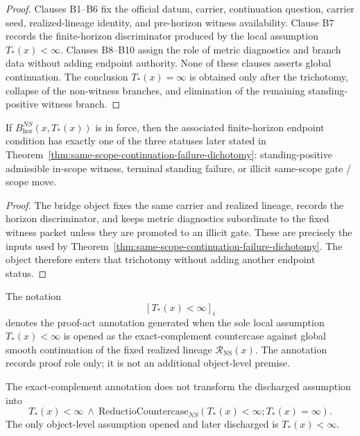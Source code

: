 \begin{proof}
Clauses B1--B6 fix the official datum, carrier, continuation question, carrier seed, realized-lineage identity, and pre-horizon witness availability. Clause B7 records the finite-horizon discriminator produced by the local assumption $T_*(x)<\infty$. Clauses B8--B10 assign the role of metric diagnostics and branch data without adding endpoint authority. None of these clauses asserts global continuation. The conclusion $T_*(x)=\infty$ is obtained only after the trichotomy, collapse of the non-witness branches, and elimination of the remaining standing-positive witness branch.
\end{proof}

\begin{manualtheorem}
\label{thm:ns-horizon-bridge-trichotomy}
If $B^{NS}_{\mathrm{hor}}(x,T_*(x))$ is in force, then the associated finite-horizon endpoint condition has exactly one of the three statuses later stated in Theorem~\ref{thm:same-scope-continuation-failure-dichotomy}: standing-positive admissible in-scope witness, terminal standing failure, or illicit same-scope gate / scope move.
\end{manualtheorem}

\begin{proof}
The bridge object fixes the same carrier and realized lineage, records the horizon discriminator, and keeps metric diagnostics subordinate to the fixed witness packet unless they are promoted to an illicit gate. These are precisely the inputs used by Theorem~\ref{thm:same-scope-continuation-failure-dichotomy}. The object therefore enters that trichotomy without adding another endpoint status.
\end{proof}

\begin{manualdefinition}
\label{def:ns-local-finite-horizon-annotation}
The notation
\[
[T_*(x)<\infty]_i
\]
denotes the proof-act annotation generated when the sole local assumption $T_*(x)<\infty$ is opened as the exact-complement countercase against global smooth continuation of the fixed realized lineage $\mathcal R_{\mathrm{NS}}(x)$. The annotation records proof role only; it is not an additional object-level premise.
\end{manualdefinition}

\begin{manualtheorem}
\label{thm:ns-annotation-not-premise}
The exact-complement annotation does not transform the discharged assumption into
\[
T_*(x)<\infty\ \wedge\ \mathrm{ReductioCountercase}_{NS}(T_*(x)<\infty;T_*(x)=\infty).
\]
The only object-level assumption opened and later discharged is $T_*(x)<\infty$.
\end{manualtheorem}

